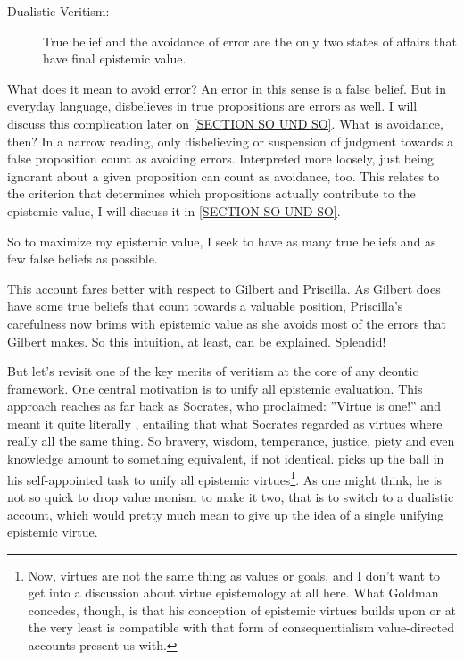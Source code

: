 \documentclass[12pt,numbers=noenddot]{scrartcl}
\begin{document}
\begin{description}
    \item[Dualistic Veritism:] True belief and the avoidance of error are the only two states of affairs that have final epistemic value.
\end{description}
\label{SECTION SO UND SO}
What does it mean to avoid error? An error in this sense \textcite[362]{Berker2013-BERETA-2} is a false belief. But in everyday language, disbelieves in true propositions are errors as well. I will discuss this complication later on \ref{SECTION SO UND SO}. What is avoidance, then? In a narrow reading, only disbelieving or suspension of judgment towards a false proposition count as avoiding errors. Interpreted more loosely, just being ignorant about a given proposition can count as avoidance, too. This relates to the criterion that determines which propositions actually contribute to the epistemic value, I will discuss it in \ref{SECTION SO UND SO}.

So to maximize my epistemic value, I seek to have as many true beliefs and as few false beliefs as possible.

This account fares better with respect to Gilbert and Priscilla. As Gilbert does have some true beliefs that count towards a valuable position, Priscilla’s carefulness now brims with epistemic value as she avoids most of the errors that Gilbert makes. So this intuition, at least, can be explained. Splendid!

But let's revisit one of the key merits of veritism at the core of any deontic framework. One central motivation is to unify all epistemic evaluation. This approach reaches as far back as Socrates, who proclaimed: ”Virtue is one!” and meant it quite literally \textcite{penner1973}, entailing that what Socrates regarded as virtues where really all the same thing. So bravery, wisdom, temperance, justice, piety and even knowledge amount to something equivalent, if not identical.
\textcite{Goldman2002-GOLTUO-2} picks up the ball in his self-appointed task to unify all epistemic virtues\footnote{Now, virtues are not the same thing as values or goals, and I don't want to get into a discussion about virtue epistemology at all here. What Goldman concedes, though, is that his conception of epistemic virtues builds upon or at the very least is compatible with that form of consequentialism value-directed accounts present us with.}. As one might think, he is not so quick to drop value monism to make it two, that is to switch to a dualistic account, which would pretty much mean to give up the idea of a single unifying epistemic virtue.
\end{document}
